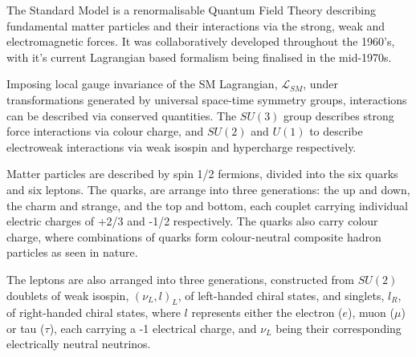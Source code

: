 The Standard Model is a renormalisable Quantum Field Theory describing
fundamental matter particles and their interactions via the strong,
weak and electromagnetic forces. It was collaboratively developed throughout the
1960's, with it's current Lagrangian based formalism being finalised in the
mid-1970s.

Imposing local gauge invariance of the SM Lagrangian, $\mathcal{L}_{SM}$, under
transformations generated by universal space-time symmetry groups,
interactions can be described via conserved quantities. The $SU(3)$ group
describes strong force interactions via colour charge, and $SU(2)$ and $U(1)$ to
describe electroweak interactions via weak isospin and hypercharge respectively.


Matter particles are described by spin 1/2 fermions, divided into the six quarks
and six leptons. The quarks, are arrange into three generations: the up and
down, the charm and strange, and the top and bottom, each couplet carrying
individual electric charges of +2/3 and -1/2 respectively. The quarks also carry
colour charge, where combinations of quarks form colour-neutral composite
hadron particles as seen in nature.


The leptons are also arranged into three generations, constructed from $SU(2)$
doublets of weak isospin, $(\nu_L, l)_L$, of left-handed chiral states, and
singlets, $l_R$, of right-handed chiral states, where $l$ represents either the
electron ($e$), muon ($\mu$) or tau ($\tau$), each carrying a -1 electrical
charge, and $\nu_L$ being their corresponding electrically neutral neutrinos.


